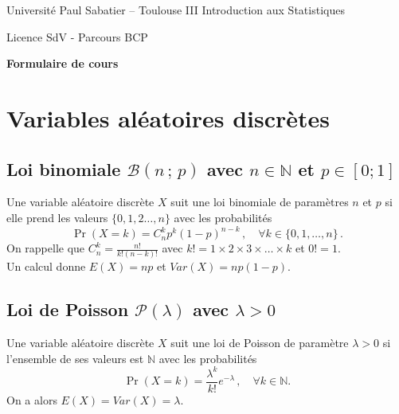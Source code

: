 \documentclass[12pt, a4paper]{article}
\begin{document}
\noindent Université Paul Sabatier -- Toulouse III \hfill  Introduction aux Statistiques

\noindent Licence SdV - Parcours BCP


\bigskip
\bigskip

\begin{center}
{\huge {\bf Formulaire de cours}}
\end{center}

\bigskip
{}

\section{Variables aléatoires discrètes}

\subsection[Loi binomiale]{Loi binomiale $\mathcal{B}(n\,;\,p)$ avec $n\in\mathbb{N}$ et $p\in[0;1]$}

Une variable aléatoire discrète $X$ suit une loi binomiale de paramètres $n$ et $p$ si elle prend les 
valeurs  $\{0, 1, 2\hdots, n\}$ avec les probabilités 
$$
\Pr(X=k)=C^k_n p^k (1-p)^{n-k}\,, \quad \forall k\in\{0,1,\hdots , n\}\,.
$$
On rappelle que $C^k_n=\frac{n !}{k! (n-k)!}$ avec $k!=1\times 2\times 3\times\hdots\times k$ et $0!=1$. \\
Un calcul donne $E(X)=np$ et $Var(X)=np(1-p)$.


\subsection[Loi de Poisson]{Loi de Poisson $\mathcal{P}(\lambda)$ avec $\lambda>0$}

Une variable aléatoire discrète $X$ suit une loi de Poisson de paramètre $\lambda>0$ si l'ensemble de ses valeurs est
$\mathbb{N}$ avec les probabilités 
$$
\Pr(X=k)=\frac{\lambda^k}{k !} e^{-\lambda} \,, \quad \forall k\in\mathbb{N}.
$$
On a alors $E(X)=Var(X)=\lambda$.\\
\end{document}
